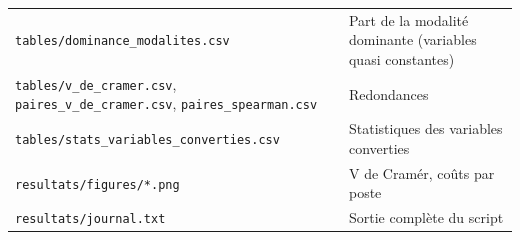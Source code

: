 \documentclass[

  french,

  10pt,

  a4paper,

]{article}
\begin{document}
{\begin{longtable}[]{@{}

  >{\raggedright\arraybackslash}p{}

  >{\raggedright\arraybackslash}p{}@{}}
\texttt{tables/dominance\_modalites.csv} & Part de la modalité dominante (variables quasi constantes) \\

\texttt{tables/v\_de\_cramer.csv}, \texttt{paires\_v\_de\_cramer.csv}, \texttt{paires\_spearman.csv} & Redondances \\

\texttt{tables/stats\_variables\_converties.csv} & Statistiques des variables converties \\

\texttt{resultats/figures/*.png} & V de Cramér, coûts par poste \\

\texttt{resultats/journal.txt} & Sortie complète du script \\

\end{longtable}

}
\end{document}
